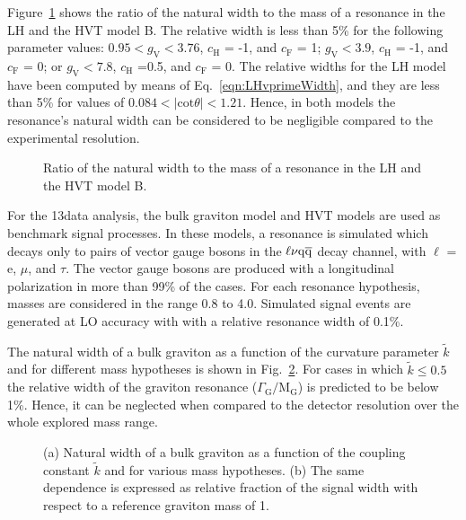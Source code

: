 Figure~\ref{fig:WHmodelsWidth} shows the ratio of the natural width to the mass of a \Wpr resonance in the LH and the HVT model B.
The relative width is less than 5\% for the following parameter values:
$0.95 < g_\mathrm{V} < 3.76$, $c_\mathrm{H}$ = -1, and $c_\mathrm{F}$ = 1;
$g_\mathrm{V} < 3.9$, $c_\mathrm{H}$ = -1, and $c_\mathrm{F}$ = 0;
or $g_\mathrm{V} < 7.8$, $c_\mathrm{H}$ =0.5, and $c_\mathrm{F}$ = 0.
The relative widths for the LH model have been computed by means of Eq.~\ref{eqn:LHvprimeWidth}, and they are less than 5\%
for values of $0.084 < |\mathrm{cot}\theta| < 1.21$. Hence, in both models the resonance's natural width can be considered to be negligible compared to the experimental resolution.\\

\begin{figure}[!htb]
\centering
{}
\caption{Ratio of the natural width to the mass of a \Wpr resonance in the LH and the HVT model B.}
\label{fig:WHmodelsWidth}
\end{figure}

For the 13\TeV data analysis, the bulk graviton model and HVT models are used as benchmark signal processes.
In these models, a resonance is simulated which decays only to pairs of vector gauge bosons in the $\ell\nu\mathrm{q}\overline{\mathrm{q}}$ decay channel, with $\ell$ = e, $\mu$, and $\tau$.
The vector gauge bosons are produced with a longitudinal polarization in more than 99\% of the cases.
For each resonance hypothesis, masses are considered in the range 0.8 to 4.0\TeV.
Simulated signal events are generated at LO accuracy with \amcatnlo{} with a relative resonance width of 0.1\%.

The natural width of a bulk graviton as a function of the curvature parameter $\tilde{k}$ and for different mass hypotheses is shown in Fig.~\ref{fig:bulkGwidth}.
For cases in which $\tilde{k} \leq 0.5$ the relative width of the graviton resonance ($\Gamma_\mathrm{G}/\mathrm{M}_\mathrm{G}$)
is predicted to be below 1\%. Hence, it can be neglected when compared to the detector resolution over the whole explored mass range.

\begin{figure}[!htb]
\centering
{}
\caption{(a) Natural width of a bulk graviton as a function of the coupling constant $\tilde{k}$ and for various mass hypotheses. (b) The same dependence is expressed as relative fraction of the signal width with respect to a reference graviton mass of 1\TeV.}
\label{fig:bulkGwidth}
\end{figure}

